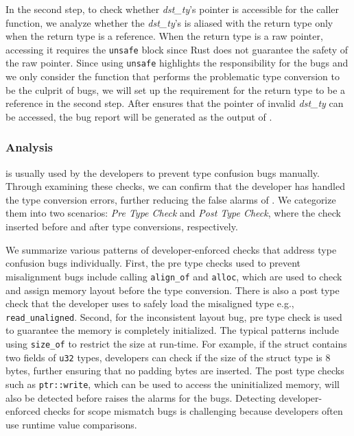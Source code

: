In the second step, to check whether \textit{dst\_ty}'s pointer is accessible for the caller function, we analyze whether the \textit{dst\_ty}'s is aliased with the return type only when the return type is a reference.
%
When the return type is a raw pointer, accessing it requires the \texttt{unsafe} block since Rust does not guarantee the safety of the raw pointer.
%
Since using \texttt{unsafe} highlights the responsibility for the bugs and we only consider the function that performs the problematic type conversion to be the culprit of bugs, we will set up the requirement for the return type to be a reference in the second step.
%
%
%
After \checktwo ensures that the pointer of invalid \textit{dst\_ty} can be accessed, the bug report will be generated as the output of \bugdetector.

\subsubsection{\TC Analysis}
\label{sec:manualtypecheck}
{\TC is usually used by the developers to prevent type confusion bugs manually. Through examining these checks, we can confirm that the developer has handled the type conversion errors, further reducing the false alarms of \TN{}.
%
We categorize them into two scenarios: \textit{Pre Type Check} and \textit{Post Type Check}, where the check inserted before and after type conversions, respectively.} 


{We summarize various patterns of developer-enforced checks that address type confusion bugs individually.
First, the pre type checks used to prevent misalignment bugs include calling \texttt{align\_of} and \texttt{alloc}, which are used to check and assign memory layout before the type conversion. 
%
There is also a post type check that the developer uses to safely load the misaligned type e.g., \texttt{read\_unaligned}. 
%
Second, for the inconsistent layout bug, pre type check is used to guarantee the memory is completely initialized. 
%
The typical patterns include using \texttt{size\_of} to restrict the size at run-time.
%
For example, if the struct contains two fields of \texttt{u32} types, developers can check if the size of the struct type is 8 bytes, further ensuring that no padding bytes are inserted.
%
The post type checks such as \texttt{ptr::write}, which can be used to access the uninitialized memory, will also be detected before \TN raises the alarms for the bugs.
Detecting developer-enforced checks for scope mismatch bugs is challenging because developers often use runtime value comparisons.}






